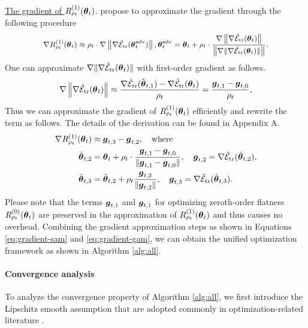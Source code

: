 \noindent \underline{The gradient of $R^{(1)}_{\rho_t}(\boldsymbol{\theta}_t)$}. \cite{Zhang2023GradientNA} propose to approximate the gradient through the following procedure
\begin{equation*}
    \small
    \nabla R^{(1)}_{\rho_t}(\boldsymbol{\theta}_t) \approx \rho_t \cdot \nabla \left\|\nabla \hat{\mathcal{E}}_{{\text{tr}}}(\boldsymbol{\theta}^{\text{adv}}_t)\right\|, \boldsymbol{\theta}^{\text{adv}}_t = \boldsymbol{\theta}_t + \rho_t \cdot \frac{\nabla \left\|\nabla \hat{\mathcal{E}}_{{\text{tr}}}(\boldsymbol{\theta}_t)\right\|}{\left\|\nabla \|\nabla \hat{\mathcal{E}}_{{\text{tr}}}(\boldsymbol{\theta}_t)\|\right\|}.
\end{equation*}
One can approximate $\nabla\|\nabla \hat{\mathcal{E}}_{{\text{tr}}}(\boldsymbol{\theta}_t)\|$ with first-order gradient as follows.
\begin{equation*}
    \nabla\left\|\nabla \hat{\mathcal{E}}_{{\text{tr}}}(\boldsymbol{\theta}_t)\right\| \approx \frac{\nabla \hat{\mathcal{E}}_{{\text{tr}}}(\tilde{\boldsymbol{\theta}}_{t,1}) - \nabla \hat{\mathcal{E}}_{{\text{tr}}}(\boldsymbol{\theta}_t)}{\rho_t} = \frac{\boldsymbol{g}_{t,1} - \boldsymbol{g}_{t,0}}{\rho_t},
\end{equation*}
Thus we can approximate the gradient of $R^{(1)}_{\rho_t}(\boldsymbol{\theta}_t)$ efficiently and rewrite the term as follows. The details of the derivation can be found in Appendix A.
\begin{equation} \label{eq:gradient-gam}
    \begin{aligned}
        \nabla R^{(1)}_{\rho_t}(\boldsymbol{\theta}_t) & \approx \boldsymbol{g}_{t,3} - \boldsymbol{g}_{t,2}, \quad \text{where} \\
        \tilde{\boldsymbol{\theta}}_{t,2} & = \boldsymbol{\theta}_t + \rho_t \cdot \frac{\boldsymbol{g}_{t,1} - \boldsymbol{g}_{t,0}}{\|\boldsymbol{g}_{t,1} - \boldsymbol{g}_{t,0}\|}, \quad \boldsymbol{g}_{t,2} = \nabla \hat{\mathcal{E}}_{{\text{tr}}}(\tilde{\boldsymbol{\theta}}_{t,2}), \\
        \tilde{\boldsymbol{\theta}}_{t,3} & = \tilde{\boldsymbol{\theta}}_{t,2} + \rho_t \frac{\boldsymbol{g}_{t,2}}{\|\boldsymbol{g}_{t,2}\|}, \quad \boldsymbol{g}_{t,3} = \nabla \hat{\mathcal{E}}_{{\text{tr}}}(\tilde{\boldsymbol{\theta}}_{t,3}).
    \end{aligned}
\end{equation}
Please note that the terms $\boldsymbol{g}_{t,1}$ and $\boldsymbol{g}_{t,1}$ for optimizing zeroth-order flatness $R^{(0)}_{\rho_t}(\boldsymbol{\theta}_t)$ are preserved in the approximation of $R^{(1)}_{\rho_t}(\boldsymbol{\theta}_t)$ and thus causes no overhead.
Combining the gradient approximation steps as shown in Equations \eqref{eq:gradient-sam} and \eqref{eq:gradient-gam}, we can obtain the unified optimization framework as shown in Algorithm \ref{alg:all}.


\paragraph{Convergence analysis} To analyze the convergence property of Algorithm \ref{alg:all}, we first introduce the Lipschitz smooth assumption that are adopted commonly in optimization-related literature \cite{allen2018neon2,xu2018first,zhuang2022surrogate}.

